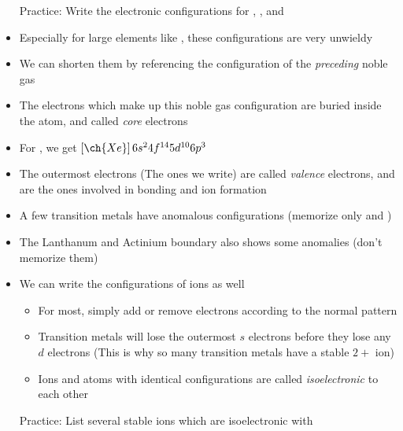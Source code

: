 \documentclass[12pt, openany, letterpaper]{memoir}
\begin{document}
\begin{itemize}
	      Practice: Write the electronic configurations for , , and 
	\item Especially for large elements like , these configurations are very unwieldy
	\item We can shorten them by referencing the configuration of the \emph{preceding} noble gas
	\item The electrons which make up this noble gas configuration are buried inside the atom, and called \emph{core} electrons
	\item For , we get $\left[\ch{Xe}\right]6s^24f^{14}5d^{10}6p^3$
	\item The outermost electrons (The ones we write) are called \emph{valence} electrons, and are the ones involved in bonding and ion formation
	\item A few transition metals have anomalous configurations (memorize only  and )
	\item The Lanthanum and Actinium boundary also shows some anomalies (don't memorize them)
	\item We can write the configurations of ions as well
	      \begin{itemize}
		      \item For most, simply add or remove electrons according to the normal pattern
		      \item Transition metals will lose the outermost $s$ electrons before they lose any $d$ electrons (This is why so many transition metals have a stable $2+$ ion)
		      \item Ions and atoms with identical configurations are called \emph{isoelectronic} to each other
	      \end{itemize}
	      Practice: List several stable ions which are isoelectronic with 
\end{itemize}
\end{document}

